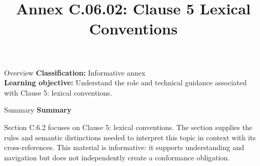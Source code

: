 \documentclass[10pt,letterpaper]{article}
\title{Annex C.06.02: Clause 5 Lexical Conventions}
\author{}
\date{}
\begin{document}
\maketitle
\begin{CornellOverviewBox}{Overview}
\textbf{Classification:} Informative annex\\[2pt]
\textbf{Learning objective:} Understand the role and technical guidance associated with Clause 5: lexical conventions.
\end{CornellOverviewBox}\begin{CornellSummaryBox}{Summary}
{\sffamily\bfseries\color{Accent} Summary}\par\vspace{3pt}Section C.6.2 focuses on Clause 5: lexical conventions. The section supplies the rules and semantic distinctions needed to interpret this topic in context with its cross-references. This material is informative: it supports understanding and navigation but does not independently create a conformance obligation.
\end{CornellSummaryBox}
\end{document}

